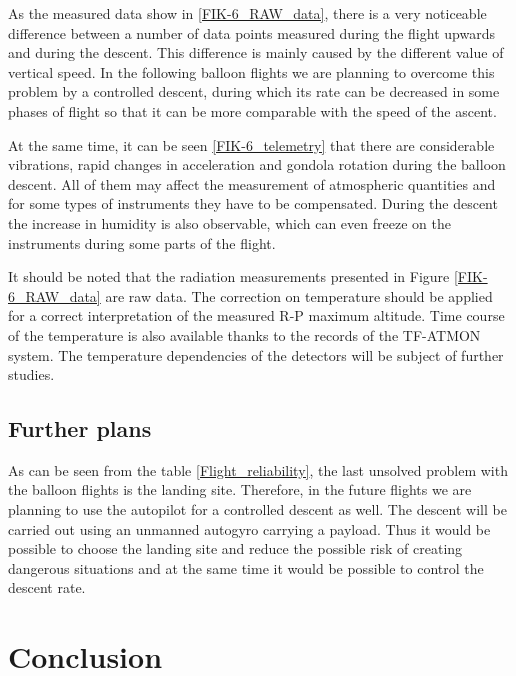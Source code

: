 \documentclass{Rpd}
\begin{document}
As the measured data show in \ref{FIK-6_RAW_data}, there is a very noticeable difference between a number of data points measured during the flight upwards and during the descent. This difference is mainly caused by the  different value of vertical speed. In the following balloon flights we are planning to overcome this problem by a controlled descent, during which its rate can be decreased in some phases of flight so that it can be more comparable with the speed of the ascent.

At the same time, it can be seen \ref{FIK-6_telemetry} that there are considerable vibrations, rapid changes in acceleration and gondola rotation during the balloon descent. All of them may affect the measurement of atmospheric quantities and for some types of instruments they have to be compensated. During the descent the increase in humidity is also observable, which can even freeze on the instruments during some parts of the flight.

It should be noted that the radiation measurements presented in Figure \ref{FIK-6_RAW_data} are raw data. The correction on temperature should be applied for a correct interpretation of the measured R-P maximum altitude. Time course of the temperature is also available thanks to the records of the TF-ATMON system. The temperature dependencies of the detectors  will be subject of further studies.


\subsection{Further plans}

As can be seen from the table \ref{Flight_reliability}, the last unsolved problem with the balloon flights is the landing site. Therefore, in the future flights we are planning to use the autopilot for a controlled descent as well.
The descent will be carried out using an unmanned autogyro carrying a payload. Thus it would be possible to choose the landing site and reduce the possible risk of creating dangerous situations and at the same time it would be possible to control the descent rate. 

\section{Conclusion}
\end{document}
